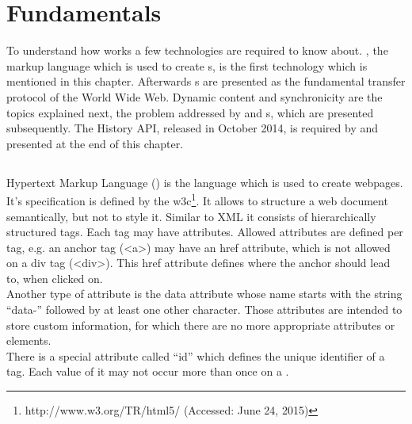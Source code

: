 \section{Fundamentals}

To understand how \lare{} works a few technologies are required to know about.
\html{}, the markup language which is used to create \webPage{}s, is the first technology which is mentioned in this chapter.
Afterwards \httpRequest{}s are presented as the fundamental transfer protocol of the World Wide Web.
Dynamic content and synchronicity are the topics explained next, the problem addressed by \ajax{} and \singlePageApplication{}s, which are presented subsequently.
The History API, released in October 2014, is required by \lare{} and presented at the end of this chapter.

\subsection{\html{}\label{html}}
Hypertext Markup Language (\html{}) is the language which is used to create webpages.
It's specification is defined by the \gls{w3c}\footnote{http://www.w3.org/TR/html5/ (Accessed: June 24, 2015)}.
It allows to structure a web document semantically, but not to style it.
Similar to XML it consists of hierarchically structured tags.
Each tag may have attributes.
Allowed attributes are defined per tag, e.g. an anchor tag (<a>) may have an href attribute, which is not allowed on a div tag (<div>).
This href attribute defines where the anchor should lead to, when clicked on.
\\
Another type of attribute is the data attribute whose name starts with the string \enquote{data-} followed by at least one other character.
Those attributes are intended to store custom information, for which there are no more appropriate attributes or elements.
\\
There is a special attribute called \enquote{id} which defines the unique identifier of a tag.
Each value of it may not occur more than once on a \webPage{}.

